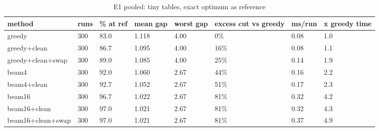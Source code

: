 \begin{table}[t]\centering\small
\caption{E1 pooled: tiny tables, exact optimum as reference}
\begin{tabular}{llllllll}
\toprule
method & runs & \% at ref & mean gap & worst gap & excess cut vs greedy & ms/run & x greedy time \\
\midrule
greedy & 300 & 83.0 & 1.118 & 4.00 & 0\% & 0.08 & 1.0 \\
greedy+clean & 300 & 86.7 & 1.095 & 4.00 & 16\% & 0.08 & 1.1 \\
greedy+clean+swap & 300 & 89.0 & 1.085 & 4.00 & 25\% & 0.14 & 1.9 \\
beam4 & 300 & 92.0 & 1.060 & 2.67 & 44\% & 0.16 & 2.2 \\
beam4+clean & 300 & 92.7 & 1.052 & 2.67 & 51\% & 0.17 & 2.3 \\
beam16 & 300 & 96.7 & 1.022 & 2.67 & 81\% & 0.32 & 4.2 \\
beam16+clean & 300 & 97.0 & 1.021 & 2.67 & 81\% & 0.32 & 4.3 \\
beam16+clean+swap & 300 & 97.0 & 1.021 & 2.67 & 81\% & 0.37 & 4.9 \\
\bottomrule
\end{tabular}\end{table}

